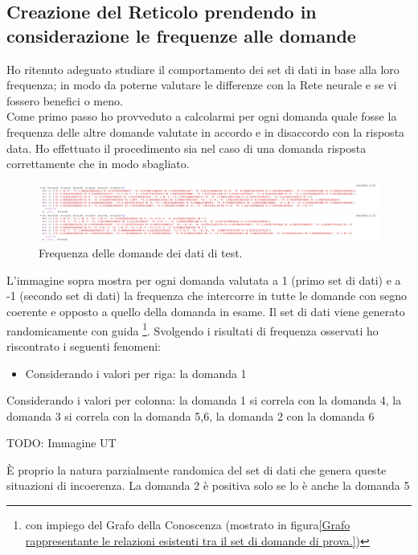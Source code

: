 \subsection{Creazione del Reticolo prendendo in considerazione le frequenze alle domande}
\label{Creazione del Reticolo prendendo in considerazione le frequenze alle domande}
Ho ritenuto adeguato studiare il comportamento dei set di dati in base alla loro frequenza; in modo da poterne valutare le differenze con la Rete neurale e se vi fossero benefici o meno.\\
Come primo passo ho provveduto a calcolarmi per ogni domanda quale fosse la frequenza delle altre domande valutate in accordo e in disaccordo con la risposta data. Ho effettuato il procedimento sia nel caso di una domanda risposta correttamente che in modo sbagliato.


\noindent
\begin{figure}[H]
\centering
	\includegraphics[width=1\linewidth]{./image/res_frequenceMatrix_OSS.png}
	\caption{Frequenza delle domande dei dati di test.}
	\label{Frequenza delle domande dei dati di test.}
\end{figure}
L'immagine sopra mostra per ogni domanda valutata a 1 (primo set di dati) e a -1 (secondo set di dati) la frequenza che intercorre in tutte le domande con segno coerente e opposto a quello della domanda in esame.
Il set di dati viene generato randomicamente con guida \footnote{con impiego del Grafo della Conoscenza (mostrato in figura\ref{Grafo rappresentante le relazioni esistenti tra il set di domande di prova.})}.
Svolgendo i risultati di frequenza osservati ho riscontrato i seguenti fenomeni:
\begin{itemize}
\item Considerando i valori per riga: la domanda 1 
\end{itemize}
\item Considerando i valori per colonna: la domanda 1 si correla con la domanda 4, la domanda 3 si correla con la domanda 5,6, la domanda 2 con la domanda 6




TODO: Immagine UT



 \`E proprio la natura parzialmente randomica del set di dati che genera queste situazioni di incoerenza. La domanda 2 \`e positiva solo se lo \`e anche la domanda 5 
\noindent



